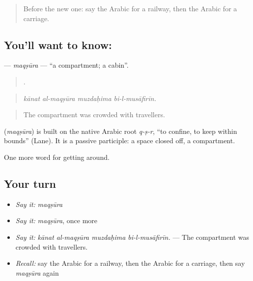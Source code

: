 \begin{quote}
Before the new one: say the Arabic for a railway, then the Arabic for a carriage.
\end{quote}

\subsection*{You'll want to know: }
\textbf{} — \emph{maqṣūra} — \textquotedblleft{}a compartment; a cabin\textquotedblright{}.

\begin{quote}
   .
\end{quote}

\begin{quote}
\emph{kānat al-maqṣūra muzdaḥima bi-l-musāfirīn.}
\end{quote}

\begin{quote}
The compartment was crowded with travellers.
\end{quote}

\begin{cousinweb}
\textbf{} (\emph{maqṣūra}) is built on the native Arabic root \emph{q-ṣ-r}, \textquotedblleft{}to confine, to keep within bounds\textquotedblright{} (Lane). It is a passive participle: a space closed off, a compartment.
\end{cousinweb}

\begin{grammarlens}[title={What you've built}]
One more word for getting around.
\end{grammarlens}

\subsection*{Your turn}
\begin{itemize}
\raggedright
  \item \emph{Say it:} \emph{maqṣūra}
  \item \emph{Say it:} \emph{maqṣūra}, once more
  \item \emph{Say it:} \emph{kānat al-maqṣūra muzdaḥima bi-l-musāfirīn.} — The compartment was crowded with travellers.
  \item \emph{Recall:} say the Arabic for a railway, then the Arabic for a carriage, then say \emph{maqṣūra} again
\end{itemize}

